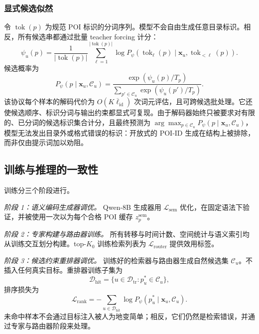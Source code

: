 \documentclass[10pt,fontset=none,twocolumn]{ctexart}
\newcommand{\Train}{\mathcal{D}_{\mathrm{tr}}}
\newcommand{\HitTrain}{\mathcal{D}_{\mathrm{hit}}}
\begin{document}
\subsubsection{显式候选似然}

令 $\operatorname{tok}(p)$ 为规范 POI 标识的分词序列。模型不会自由生成任意目录标识。相反，所有候选串都通过批量 teacher forcing 计分：
\begin{equation}
\psi_u(p)
=
\frac{1}{|\operatorname{tok}(p)|}
\sum_{\ell=1}^{|\operatorname{tok}(p)|}
\log
P_{\psi}
\left(
\operatorname{tok}_{\ell}(p)
\mid
\bm{x}_u,
\operatorname{tok}_{<\ell}(p)
\right).
\label{eq:candidate_likelihood}
\end{equation}
候选概率为
\begin{equation}
P_{\psi}(p\mid\bm{x}_u,\mathcal{C}_u)
=
\frac{\exp(\psi_u(p)/T_p)}
{\sum_{p'\in\mathcal{C}_u}\exp(\psi_u(p')/T_p)}.
\label{eq:candidate_probability}
\end{equation}
该协议每个样本的解码代价为 $O(K\overline{\ell}_{\mathrm{id}})$ 次词元评估，且可跨候选批处理。它还使候选顺序、标识分词与输出约束都显式可复现。由于解码器始终只被要求对有限的、已分词的候选标识集合计分，且最终预测为 $\arg\max_{p\in\mathcal{C}_u}P_{\psi}(p\mid\bm{x}_u,\mathcal{C}_u)$，模型无法发出目录外或格式错误的标识：开放式的 POI-ID 生成在结构上被排除，而非仅由提示词加以劝阻。

\subsection{训练与推理的一致性}
\label{subsec:training}

训练分三个阶段进行。

\textit{阶段 1：语义编码生成器调优。} Qwen-8B 生成器用 $\mathcal{L}_{\mathrm{sem}}$ 优化，在固定语法下验证，并被使用一次以为每个合格 POI 缓存 $z_p^{\mathrm{sem}}$。

\textit{阶段 2：专家构建与路由器训练。} 所有转移与时间计数、空间统计与语义索引均从训练交互划分构建。top-$K_0$ 训练检索列表为 $\mathcal{L}_{\mathrm{router}}$ 提供效用标签。

\textit{阶段 3：候选约束重排器调优。} 训练好的检索器与路由器生成自然候选集 $\mathcal{C}_u$。不插入任何真实目标。重排器训练子集为
\begin{equation}
\HitTrain
=
\{u\in\Train:p_u^{*}\in\mathcal{C}_u\},
\label{eq:hit_training_set}
\end{equation}
排序损失为
\begin{equation}
\mathcal{L}_{\mathrm{rank}}
=
-
\sum_{u\in\HitTrain}
\log
P_{\psi}(p_u^{*}\mid\bm{x}_u,\mathcal{C}_u).
\label{eq:rank_loss}
\end{equation}
未命中样本不会通过目标注入被人为地变简单；相反，它们仍然是检索错误，并通过专家与路由器阶段来处理。
\end{document}
